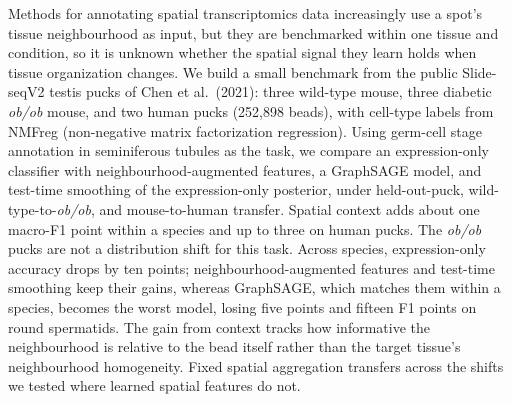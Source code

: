 Methods for annotating spatial transcriptomics data increasingly use a spot's tissue neighbourhood as input, but they are benchmarked within one tissue and condition, so it is unknown whether the spatial signal they learn holds when tissue organization changes. We build a small benchmark from the public Slide-seqV2 testis pucks of Chen et al.\ (2021): three wild-type mouse, three diabetic \emph{ob/ob} mouse, and two human pucks (252,898 beads), with cell-type labels from NMFreg (non-negative matrix factorization regression). Using germ-cell stage annotation in seminiferous tubules as the task, we compare an expression-only classifier with neighbourhood-augmented features, a GraphSAGE model, and test-time smoothing of the expression-only posterior, under held-out-puck, wild-type-to-\emph{ob/ob}, and mouse-to-human transfer. Spatial context adds about one macro-F1 point within a species and up to three on human pucks. The \emph{ob/ob} pucks are not a distribution shift for this task. Across species, expression-only accuracy drops by ten points; neighbourhood-augmented features and test-time smoothing keep their gains, whereas GraphSAGE, which matches them within a species, becomes the worst model, losing five points and fifteen F1 points on round spermatids. The gain from context tracks how informative the neighbourhood is relative to the bead itself rather than the target tissue's neighbourhood homogeneity. Fixed spatial aggregation transfers across the shifts we tested where learned spatial features do not.
